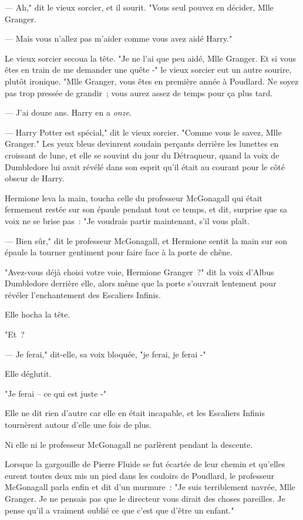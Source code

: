 --- Ah," dit le vieux sorcier, et il sourit. "Vous seul pouvez en décider, Mlle Granger.

--- Mais vous n'allez pas m'aider comme vous avez aidé Harry."

Le vieux sorcier secoua la tête. "Je ne l'ai que peu aidé, Mlle Granger. Et si vous êtes en train de me demander une quête -" le vieux sorcier eut un autre sourire, plutôt ironique. "Mlle Granger, vous êtes en première année à Poudlard. Ne soyez pas trop pressée de grandir~; vous aurez assez de temps pour ça plus tard.

--- J'ai douze ans. Harry en a \emph{onze}.

--- Harry Potter est spécial," dit le vieux sorcier. "Comme vous le savez, Mlle Granger." Les yeux bleus devinrent soudain perçants derrière les lunettes en croissant de lune, et elle se souvint du jour du Détraqueur, quand la voix de Dumbledore lui avait révélé dans son esprit qu'il était au courant pour le côté obscur de Harry.

Hermione leva la main, toucha celle du professeur McGonagall qui était fermement restée sur son épaule pendant tout ce temps, et dit, surprise que sa voix ne se brise pas~: "Je voudrais partir maintenant, s'il vous plaît.

--- Bien sûr," dit le professeur McGonagall, et Hermione sentit la main sur son épaule la tourner gentiment pour faire face à la porte de chêne.

"Avez-vous déjà choisi votre voie, Hermione Granger~?" dit la voix d'Albus Dumbledore derrière elle, alors même que la porte s'ouvrait lentement pour révéler l'enchantement des Escaliers Infinis.

Elle hocha la tête.

"Et~?

--- Je ferai," dit-elle, sa voix bloquée, "je ferai, je ferai -"

Elle déglutit.

"Je ferai -- ce qui est juste -"

Elle ne dit rien d'autre car elle en était incapable, et les Escaliers Infinis tournèrent autour d'elle une fois de plus.

Ni elle ni le professeur McGonagall ne parlèrent pendant la descente.

Lorsque la gargouille de Pierre Fluide se fut écartée de leur chemin et qu'elles eurent toutes deux mis un pied dans les couloirs de Poudlard, le professeur McGonagall parla enfin et dit d'un murmure~: "Je suis terriblement navrée, Mlle Granger. Je ne pensais pas que le directeur vous dirait des choses pareilles. Je pense qu'il a vraiment oublié ce que c'est que d'être un enfant."

